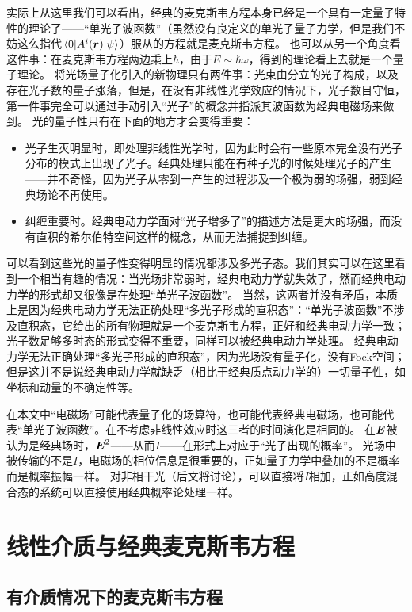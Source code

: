 实际上从这里我们可以看出，经典的麦克斯韦方程本身已经是一个具有一定量子特性的理论了——“单光子波函数”（虽然没有良定义的单光子量子力学，但是我们不妨这么指代$\mel*{0}{A^i(\vb*{r})}{\psi}$）服从的方程就是麦克斯韦方程。
也可以从另一个角度看这件事：在麦克斯韦方程两边乘上$\hbar$，由于$E \sim \hbar \omega$，得到的理论看上去就是一个量子理论。
将光场量子化引入的新物理只有两件事：光束由分立的光子构成，以及存在光子数的量子涨落，但是，在没有非线性光学效应的情况下，光子数目守恒，第一件事完全可以通过手动引入“光子”的概念并指派其波函数为经典电磁场来做到。
光的量子性只有在下面的地方才会变得重要：
\begin{itemize}
    \item 光子生灭明显时，即处理非线性光学时，因为此时会有一些原本完全没有光子分布的模式上出现了光子。经典处理只能在有种子光的时候处理光子的产生——并不奇怪，因为光子从零到一产生的过程涉及一个极为弱的场强，弱到经典场论不再使用。
    \item 纠缠重要时。经典电动力学面对“光子增多了”的描述方法是更大的场强，而没有直积的希尔伯特空间这样的概念，从而无法捕捉到纠缠。
\end{itemize}
可以看到这些光的量子性变得明显的情况都涉及多光子态。我们其实可以在这里看到一个相当有趣的情况：当光场非常弱时，经典电动力学就失效了，然而经典电动力学的形式却又很像是在处理“单光子波函数”。
当然，这两者并没有矛盾，本质上是因为经典电动力学无法正确处理“多光子形成的直积态”：“单光子波函数”不涉及直积态，它给出的所有物理就是一个麦克斯韦方程，正好和经典电动力学一致；光子数足够多时态的形式变得不重要，同样可以被经典电动力学处理。
经典电动力学无法正确处理“多光子形成的直积态”，因为光场没有量子化，没有Fock空间；但是这并不是说经典电动力学就缺乏（相比于经典质点动力学的）一切量子性，如坐标和动量的不确定性等。

在本文中“电磁场”可能代表量子化的场算符，也可能代表经典电磁场，也可能代表“单光子波函数”。在不考虑非线性效应时这三者的时间演化是相同的。
在$\vb*{E}$被认为是经典场时，$\vb*{E}^2$——从而$I$——在形式上对应于“光子出现的概率”。
光场中被传输的不是$I$，电磁场的相位信息是很重要的，正如量子力学中叠加的不是概率而是概率振幅一样。
对非相干光（后文将讨论），可以直接将$I$相加，正如高度混合态的系统可以直接使用经典概率论处理一样。

\section{线性介质与经典麦克斯韦方程}

\subsection{有介质情况下的麦克斯韦方程}

